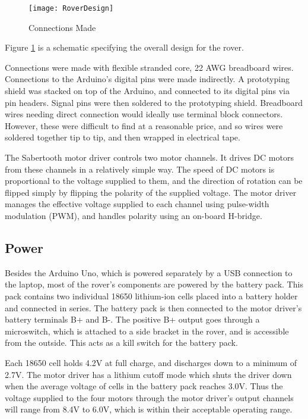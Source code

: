 \begin{figure}[p] 
	\caption{Connections Made}
	\texttt{[image: RoverDesign]}
	\centering
	\label{figRoverDesign}
\end{figure}

Figure \ref{figRoverDesign} is a schematic specifying the overall design for the rover.

Connections were made with flexible stranded core, 22 AWG breadboard wires. Connections to the Arduino's digital pins were made indirectly. A prototyping shield was stacked on top of the Arduino, and connected to its digital pins via pin headers. Signal pins were then soldered to the prototyping shield. Breadboard wires needing direct connection would ideally use terminal block connectors. However, these were difficult to find at a reasonable price, and so wires were soldered together tip to tip, and then wrapped in electrical tape.

The Sabertooth motor driver controls two motor channels. It drives DC motors from these channels in a relatively simple way. The speed of DC motors is proportional to the voltage supplied to them, and the direction of rotation can be flipped simply by flipping the polarity of the supplied voltage. The motor driver manages the effective voltage supplied to each channel using pulse-width modulation (PWM), and handles polarity using an on-board H-bridge. \cite{dcMotorBlog}


\subsection{Power}
Besides the Arduino Uno, which is powered separately by a USB connection to the laptop, most of the rover's components are powered by the battery pack. This pack contains two individual 18650 lithium-ion cells placed into a battery holder and connected in series. The battery pack is then connected to the motor driver's battery terminals B+ and B-. The positive B+ output goes through a microswitch, which is attached to a side bracket in the rover, and is accessible from the outside. This acts as a kill switch for the battery pack.

Each 18650 cell holds 4.2V at full charge, and discharges down to a minimum of 2.7V. The motor driver has a lithium cutoff mode which shuts the driver down when the average voltage of cells in the battery pack reaches 3.0V. Thus the voltage supplied to the four motors through the motor driver's output channels will range from 8.4V to 6.0V, which is within their acceptable operating range.

